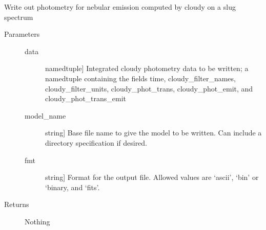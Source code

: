 \documentclass[letterpaper,10pt,english]{sphinxmanual}
\begin{document}
\begin{fulllineitems}
\label{\detokenize{cloudy:slugpy.cloudy.write_integrated_cloudyphot}}
Write out photometry for nebular emission computed by cloudy on a
slug spectrum
\begin{description}
\item[{Parameters}] \leavevmode\begin{description}
\item[{data}] \leavevmode{[}namedtuple{]}
Integrated cloudy photometry data to be written; a namedtuple
containing the fields time, cloudy\_filter\_names, 
cloudy\_filter\_units, cloudy\_phot\_trans, cloudy\_phot\_emit,
and cloudy\_phot\_trans\_emit

\item[{model\_name}] \leavevmode{[}string{]}
Base file name to give the model to be written. Can include a
directory specification if desired.

\item[{fmt}] \leavevmode{[}string{]}
Format for the output file. Allowed values are ‘ascii’, ‘bin’
or ‘binary, and ‘fits’.

\end{description}

\item[{Returns}] \leavevmode
Nothing

\end{description}

\end{fulllineitems}

\end{document}
